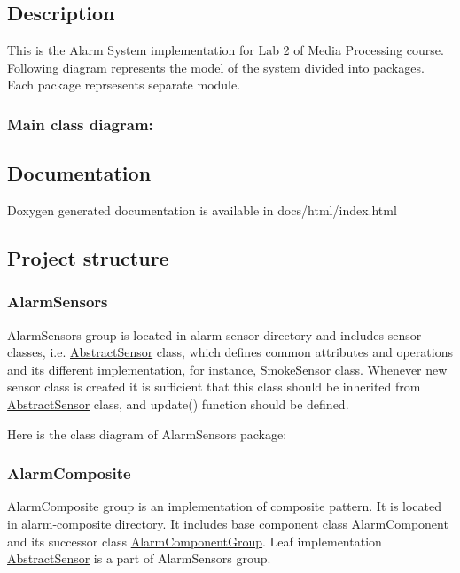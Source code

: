 \subsection*{Description}

This is the Alarm System implementation for Lab 2 of Media Processing course. Following diagram represents the model of the system divided into packages. Each package reprsesents separate module.

\subsubsection*{Main class diagram\+:}



\subsection*{Documentation}

Doxygen generated documentation is available in docs/html/index.\+html

\subsection*{Project structure}

\subsubsection*{Alarm\+Sensors}

Alarm\+Sensors group is located in {\ttfamily alarm-\/sensor} directory and includes sensor classes, i.\+e. {\ttfamily \hyperlink{classAbstractSensor}{Abstract\+Sensor}} class, which defines common attributes and operations and its different implementation, for instance, {\ttfamily \hyperlink{classSmokeSensor}{Smoke\+Sensor}} class. Whenever new sensor class is created it is sufficient that this class should be inherited from {\ttfamily \hyperlink{classAbstractSensor}{Abstract\+Sensor}} class, and {\ttfamily update()} function should be defined.

Here is the class diagram of Alarm\+Sensors package\+:



\subsubsection*{Alarm\+Composite}

Alarm\+Composite group is an implementation of composite pattern. It is located in {\ttfamily alarm-\/composite} directory. It includes base component class {\ttfamily \hyperlink{classAlarmComponent}{Alarm\+Component}} and its successor class {\ttfamily \hyperlink{classAlarmComponentGroup}{Alarm\+Component\+Group}}. Leaf implementation {\ttfamily \hyperlink{classAbstractSensor}{Abstract\+Sensor}} is a part of Alarm\+Sensors group.

